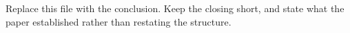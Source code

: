 Replace this file with the conclusion.
Keep the closing short, and state what the paper established rather than restating the structure.
